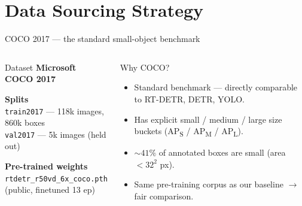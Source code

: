 \documentclass[aspectratio=169,11pt]{beamer}
\begin{document}
\section{Data Sourcing Strategy}

\begin{frame}{COCO 2017 — the standard small-object benchmark}
    \begin{columns}[T]
        \begin{block}{Dataset}
            \textbf{Microsoft COCO 2017}

            \vspace{0.5em}
            \textbf{Splits}\\
            \texttt{train2017} — 118k images, 860k boxes\\
            \texttt{val2017}\hphantom{xx} — 5k images (held out)

            \vspace{0.5em}
            \textbf{Pre-trained weights}\\
            {\small\texttt{rtdetr\_r50vd\_6x\_coco.pth}\\(public, finetuned 13 ep)}
        \end{block}

        \begin{block}{Why COCO?}
            \begin{itemize}\setlength\itemsep{0.4em}
                \item Standard benchmark — directly comparable to
                      RT-DETR, DETR, YOLO.
                \item Has explicit small / medium / large size buckets
                      (AP\textsubscript{S} / AP\textsubscript{M} / AP\textsubscript{L}).
                \item ${\sim}41\%$ of annotated boxes are small (area $< 32^{2}$ px).
                \item Same pre-training corpus as our baseline $\to$ fair comparison.
            \end{itemize}
        \end{block}
    \end{columns}
\end{frame}

\end{document}

